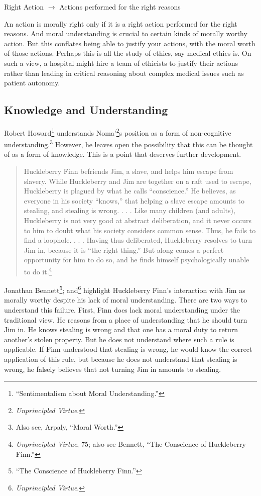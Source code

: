 \documentclass[phdthesis,12pt,final]{wuthesis}
\theoremstyle{definition}
\theoremstyle{definition}
\theoremstyle{definition}
\theoremstyle{definition}
\theoremstyle{remark}
\begin{document}
Right Action \(\rightarrow\) Actions performed for the right reasons

An action is morally right only if it is a right action performed for the right reasons. And moral understanding is crucial to certain kinds of morally worthy action. But this conflates being able to justify your actions, with the moral worth of those actions. Perhaps this is all the study of ethics, say medical ethics is. On such a view, a hospital might hire a team of ethicists to justify their actions rather than leading in critical reasoning about complex medical issues such as patient autonomy.

\subsection*{Knowledge and Understanding}\label{knowledge-and-understanding}

Robert Howard\footnote{{``Sentimentalism about {Moral Understanding}.''}} understands Noma'\footnote{\emph{Unprincipled {Virtue}}.}s position as a form of non-cognitive understanding.\footnote{Also see, Arpaly, {``Moral {Worth}.''}} However, he leaves open the possibility that this can be thought of as a form of knowledge. This is a point that deserves further development.

\begin{quote}
Huckleberry Finn befriends Jim, a slave, and helps him escape from slavery. While Huckleberry and Jim are together on a raft used to escape, Huckleberry is plagued by what he calls ``conscience.'' He believes, as everyone in his society ``knows,'' that helping a slave escape amounts to stealing, and stealing is wrong. . . . Like many children (and adults), Huckleberry is not very good at abstract deliberation, and it never occurs to him to doubt what his society considers common sense. Thus, he fails to find a loophole. . . . Having thus deliberated, Huckleberry resolves to turn Jim in, because it is ``the right thing.'' But along comes a perfect opportunity for him to do so, and he finds himself psychologically unable to do it.\footnote{\emph{Unprincipled {Virtue}}, 75; also see Bennett, {``The {Conscience} of {Huckleberry Finn}.''}}
\end{quote}

Jonathan Bennett\footnote{{``The {Conscience} of {Huckleberry Finn}.''}}; and\footnote{\emph{Unprincipled {Virtue}}.} highlight Huckleberry Finn's interaction with Jim as morally worthy despite his lack of moral understanding. There are two ways to understand this failure. First, Finn does lack moral understanding under the traditional view. He reasons from a place of understanding that he should turn Jim in. He knows stealing is wrong and that one has a moral duty to return another's stolen property. But he does not understand where such a rule is applicable. If Finn understood that stealing is wrong, he would know the correct application of this rule, but because he does not understand that stealing is wrong, he falsely believes that not turning Jim in amounts to stealing.
\end{document}
